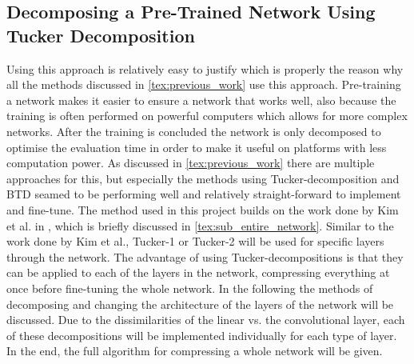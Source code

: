 \subsection{Decomposing a Pre-Trained Network Using Tucker Decomposition}
Using this approach is relatively easy to justify which is properly the reason why all the methods discussed in \autoref{tex:previous_work} use this approach. Pre-training a network makes it easier to ensure a network that works well, also because the training is often performed on powerful computers which allows for more complex networks. After the training is concluded the network is only decomposed to optimise the evaluation time in order to make it useful on platforms with less computation power. As discussed in \autoref{tex:previous_work} there are multiple approaches for this, but especially the methods using Tucker-decomposition and BTD seamed to be performing well and relatively straight-forward to implement and fine-tune.
The method used in this project builds on the work done by Kim et al. in \cite{Kim2016}, which is briefly discussed in \autoref{tex:sub_entire_network}.  Similar to the work done by Kim et al., Tucker-1 or Tucker-2 will be used for specific layers through the network. The advantage of using Tucker-decompositions is that they can be applied to each of the layers in the network, compressing everything at once before fine-tuning the whole network. In the following the methods of decomposing and changing the architecture of the layers of the network will be discussed. Due to the dissimilarities of the linear vs. the convolutional layer, each of these decompositions will be implemented individually for each type of layer. In the end, the full algorithm for compressing a whole network will be given.

